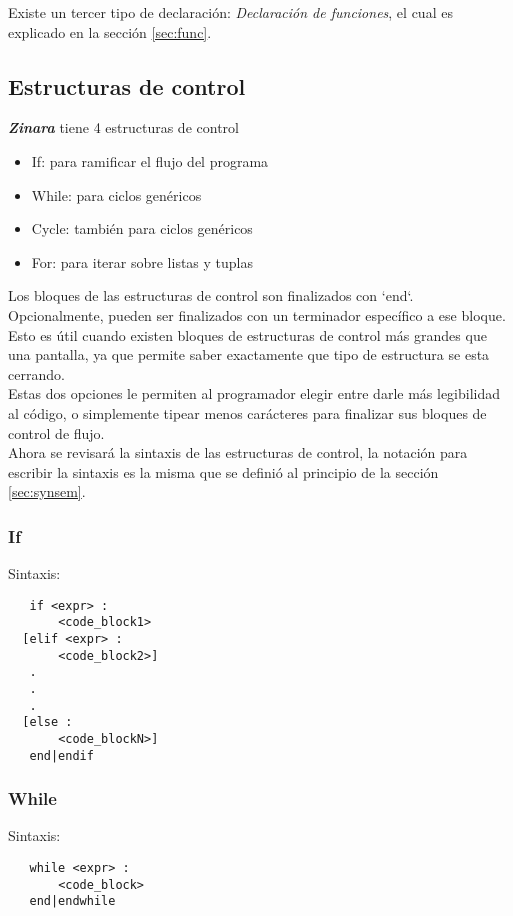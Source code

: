 \documentclass[12pt, spanish]{report}
\begin{document}
Existe un tercer tipo de declaraci\'on: \emph{Declaraci\'on de funciones},
el cual es explicado en la secci\'on \ref{sec:func}.

\subsection{Estructuras de control}
\label{sec:ecntrl}
\emph{\textbf{Zinara}} tiene 4 estructuras de control
\begin{itemize}
\item If: para ramificar el flujo del programa
\item While: para ciclos gen\'ericos
\item Cycle: tambi\'en para ciclos gen\'ericos
\item For: para iterar sobre listas y tuplas
\end{itemize}

Los bloques de las estructuras de control son finalizados
con `end`. Opcionalmente, pueden ser finalizados con un terminador
espec\'ifico a ese bloque. Esto es \'util cuando existen bloques de
estructuras de control m\'as grandes que una pantalla, ya que permite
saber exactamente que tipo de estructura se esta cerrando.\\
\indent Estas dos opciones le permiten al programador elegir entre darle m\'as
legibilidad al c\'odigo, o simplemente tipear menos car\'acteres para
finalizar sus bloques de control de flujo.\\
\indent Ahora se revisar\'a la sintaxis de las estructuras de control,
la notaci\'on para escribir la sintaxis es la misma que se defini\'o al
principio de la secci\'on \ref{sec:synsem}.

\subsubsection{If}
Sintaxis:
\begin{verbatim}
   if <expr> :
       <code_block1>
  [elif <expr> :
       <code_block2>]
   .
   .
   .
  [else :
       <code_blockN>]
   end|endif
\end{verbatim}

\subsubsection{While}
Sintaxis:
\begin{verbatim}
   while <expr> :
       <code_block>
   end|endwhile
\end{verbatim}
\end{document}
